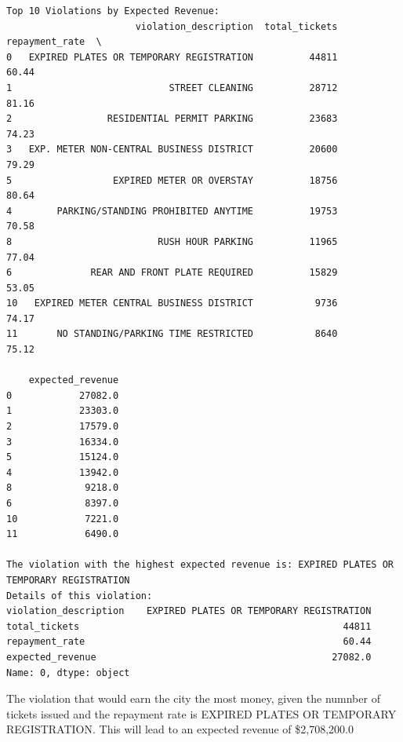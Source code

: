\documentclass[
  letterpaper,
  DIV=11,
  numbers=noendperiod]{scrartcl}
\begin{document}
\begin{verbatim}
Top 10 Violations by Expected Revenue:
                       violation_description  total_tickets  repayment_rate  \
0   EXPIRED PLATES OR TEMPORARY REGISTRATION          44811           60.44   
1                            STREET CLEANING          28712           81.16   
2                 RESIDENTIAL PERMIT PARKING          23683           74.23   
3   EXP. METER NON-CENTRAL BUSINESS DISTRICT          20600           79.29   
5                  EXPIRED METER OR OVERSTAY          18756           80.64   
4        PARKING/STANDING PROHIBITED ANYTIME          19753           70.58   
8                          RUSH HOUR PARKING          11965           77.04   
6              REAR AND FRONT PLATE REQUIRED          15829           53.05   
10   EXPIRED METER CENTRAL BUSINESS DISTRICT           9736           74.17   
11       NO STANDING/PARKING TIME RESTRICTED           8640           75.12   

    expected_revenue  
0            27082.0  
1            23303.0  
2            17579.0  
3            16334.0  
5            15124.0  
4            13942.0  
8             9218.0  
6             8397.0  
10            7221.0  
11            6490.0  

The violation with the highest expected revenue is: EXPIRED PLATES OR TEMPORARY REGISTRATION
Details of this violation:
violation_description    EXPIRED PLATES OR TEMPORARY REGISTRATION
total_tickets                                               44811
repayment_rate                                              60.44
expected_revenue                                          27082.0
Name: 0, dtype: object
\end{verbatim}

The violation that would earn the city the most money, given the numnber
of tickets issued and the repayment rate is EXPIRED PLATES OR TEMPORARY
REGISTRATION. This will lead to an expected revenue of \$2,708,200.0
\end{document}
